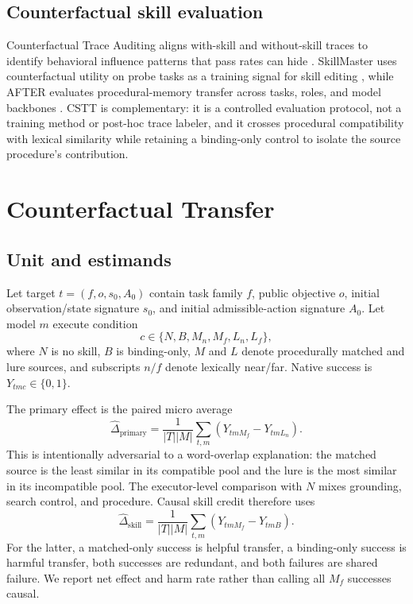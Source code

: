 \documentclass[pdflatex,sn-mathphys-num]{sn-jnl}
\begin{document}
\subsection{Counterfactual skill evaluation}
Counterfactual Trace Auditing aligns with-skill and without-skill traces to
identify behavioral influence patterns that pass rates can hide
\citep{zhou2026counterfactual}. SkillMaster uses counterfactual utility on probe
tasks as a training signal for skill editing \citep{yang2026skillmaster}, while
AFTER evaluates procedural-memory transfer across tasks, roles, and model
backbones \citep{belikova2026procedural}. CSTT is complementary: it is a
controlled evaluation protocol, not a training method or post-hoc trace labeler,
and it crosses procedural compatibility with lexical similarity while retaining
a binding-only control to isolate the source procedure's contribution.

\section{Counterfactual Transfer}
\subsection{Unit and estimands}
Let target $t=(f,o,s_0,A_0)$ contain task family $f$, public objective $o$,
initial observation/state signature $s_0$, and initial admissible-action
signature $A_0$. Let model $m$ execute condition
\[
c\in\{N,B,M_n,M_f,L_n,L_f\},
\]
where $N$ is no skill, $B$ is binding-only, $M$ and $L$ denote procedurally
matched and lure sources, and subscripts $n/f$ denote lexically near/far.
Native success is $Y_{tmc}\in\{0,1\}$.

The primary effect is the paired micro average
\[
\widehat\Delta_{\mathrm{primary}}=
\frac{1}{|T||M|}\sum_{t,m}(Y_{tmM_f}-Y_{tmL_n}).
\]
This is intentionally adversarial to a word-overlap explanation: the matched
source is the least similar in its compatible pool and the lure is the most
similar in its incompatible pool. The executor-level comparison with $N$ mixes
grounding, search control, and procedure. Causal skill credit therefore uses
\[
\widehat\Delta_{\mathrm{skill}}=
\frac{1}{|T||M|}\sum_{t,m}(Y_{tmM_f}-Y_{tmB}).
\]
For the latter, a matched-only success is helpful transfer, a binding-only
success is harmful transfer, both successes are redundant, and both failures
are shared failure. We report net effect and harm rate rather than calling all
$M_f$ successes causal.
\end{document}
